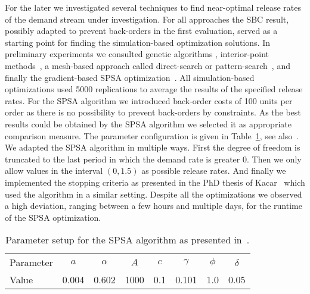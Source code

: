 \documentclass{article}
\begin{document}
For the later we investigated several techniques to find near-optimal release rates of the demand
stream under investigation. For all approaches the SBC result, possibly adapted to prevent
back-orders in the first evaluation, served as a starting point for finding the simulation-based
optimization solutions. In preliminary experiments we consulted genetic algorithms
\cite{goldberg1988genetic}, interior-point methods~\cite{byrd2000trust,byrd1999interior}, a
mesh-based approach called direct-search or pattern-search~\cite{Hooke:1961:DSS:321062.321069,
  lewis2007implementing,kolda2006stationarity}, and finally the gradient-based SPSA
optimization~\cite{spall1992multivariate,spall1998implementation,kacar2012fitting}. All
simulation-based optimizations used 5000 replications to average the results of the specified
release rates. For the SPSA algorithm we introduced back-order costs of 100 units per order as there
is no possibility to prevent back-orders by constraints.
%
As the best results could be obtained by the SPSA algorithm we selected it as appropriate comparison
measure. The parameter configuration is given in Table~\ref{tbl:params}, see
also~\cite{spall1998implementation}.
%
We adapted the SPSA algorithm in multiple ways. First the degree of freedom is truncated to the last
period in which the demand rate is greater $0$. Then we only allow values in the interval $(0,1.5)$
as possible release rates. And finally we implemented the stopping criteria as presented in the PhD
thesis of Kacar~\cite{kacar2012fitting} which used the algorithm in a similar setting.
%
Despite all the optimizations we observed a high deviation, ranging between a few hours and multiple
days, for the runtime of the SPSA optimization.


\begin{table}[t!]
  \centering
  \begin{tabular}{| l | c c c c c c c |}
    \hline
    Parameter & $a$ & $\alpha$ & $A$ & $c$ & $\gamma$ & $\phi$ & $\delta$ \\
    Value & 0.004 & 0.602 & 1000 & 0.1 & 0.101 & 1.0 & 0.05\\
    \hline
  \end{tabular}
  \caption{\label{tbl:params}Parameter setup for the SPSA algorithm as presented
    in~\cite{kacar2012fitting}.}
\end{table}


\pagebreak


\end{document}
